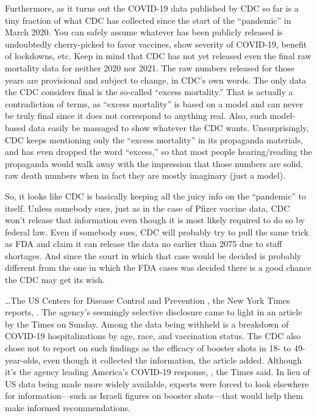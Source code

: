 \begin{refsection}
Furthermore, as it turns out the COVID-19 data published by CDC so far is a tiny fraction of what CDC has collected since the start of the \enquote{pandemic} in March 2020. You can safely assume whatever has been publicly released is undoubtedly cherry-picked to favor vaccines, show severity of COVID-19, benefit of lockdowns, etc. Keep in mind that CDC has not yet released even the final raw mortality data for neither 2020 nor 2021. The raw numbers released for those years are provisional and subject to change, in CDC's own words. The only data the CDC considers final is the so-called \enquote{excess mortality.} That is actually a contradiction of terms, as \enquote{excess mortality} is based on a model and can never be truly final since it does not correspond to anything real. Also, such model-based data easily be massaged to show whatever the CDC wants. Unsurprisingly, CDC keeps mentioning only the \enquote{excess mortality} in its propaganda materials, and has even dropped the word \enquote{excess,} so that most people hearing/reading the propaganda would walk away with the impression that those numbers are solid, raw death numbers when in fact they are mostly imaginary (just a model).

So, it looks like CDC is basically keeping all the juicy info on the \enquote{pandemic} to itself. Unless somebody sues, just as in the case of Pfizer vaccine data, CDC won't release that information even though it is most likely required to do so by federal law. Even if somebody sues, CDC will probably try to pull the same trick as FDA and claim it can release the data no earlier than 2075 due to staff shortages. And since the court in which that case would be decided is probably different from the one in which the FDA cases was decided there is a good chance the CDC may get its wish.\textsuperscript{\cite{urlodhbsd09, url91ee8196}}

\begin{tcolorbox}[quote]

\dots{}The US Centers for Disease Control and Prevention , the New York Times reports, . The agency's seemingly selective disclosure came to light\textsuperscript{\cite{url91ee8196}} in an article by the Times on Sunday. Among the data being withheld is a breakdown of COVID-19 hospitalizations by age, race, and vaccination status. The CDC also chose not to report on such findings as the efficacy of booster shots in 18- to 49-year-olds, even though it collected the information, the article added. Although it's the agency leading America's COVID-19 response, , the Times said. In lieu of US data being made more widely available, experts were forced to look elsewhere for information---such as Israeli figures on booster shots---that would help them make informed recommendations.\textsuperscript{\cite{url923bnksd}}


\end{tcolorbox}
\end{refsection}
